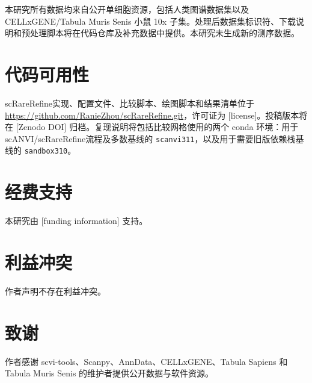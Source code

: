 \documentclass[pdflatex,sn-mathphys-num]{sn-jnl}
\theoremstyle{thmstyleone}%
\theoremstyle{thmstyletwo}%
\theoremstyle{thmstylethree}%
\newcommand{\method}{scRareRefine}
\begin{document}
本研究所有数据均来自公开单细胞资源，包括人类图谱数据集以及 CELLxGENE/Tabula Muris Senis 小鼠 10x 子集。处理后数据集标识符、下载说明和预处理脚本将在代码仓库及补充数据中提供。本研究未生成新的测序数据。

\section*{代码可用性}

\method 实现、配置文件、比较脚本、绘图脚本和结果清单位于 \url{https://github.com/RanieZhou/scRareRefine.git}，许可证为 [license]。投稿版本将在 [Zenodo DOI] 归档。复现说明将包括比较网格使用的两个 conda 环境：用于 scANVI/\method 流程及多数基线的 \texttt{scanvi311}，以及用于需要旧版依赖栈基线的 \texttt{sandbox310}。

\section*{经费支持}

本研究由 [funding information] 支持。

\section*{利益冲突}

作者声明不存在利益冲突。

\section*{致谢}

作者感谢 scvi-tools、Scanpy、AnnData、CELLxGENE、Tabula Sapiens 和 Tabula Muris Senis 的维护者提供公开数据与软件资源。


\end{document}
